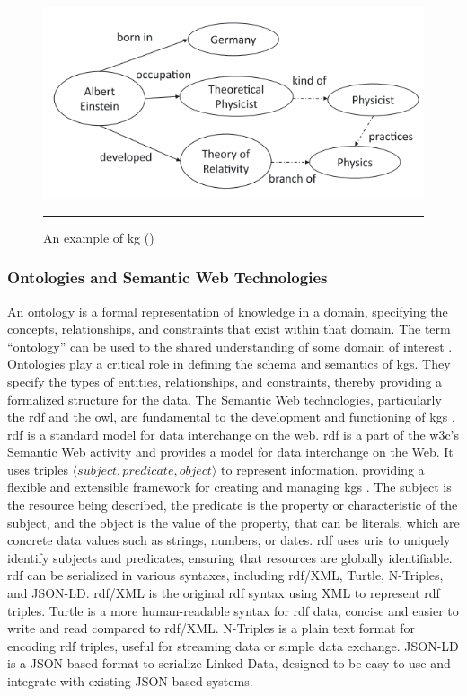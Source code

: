 \begin{figure}[htbp]
    \centering
 \includegraphics[width=.7\textwidth]{figures/literature-review/kg-example-albert-einstein.png}
     \rule{35em}{0.5pt}
    \caption{An example of \acrlong{kg} (\textcite{Chaudhri2022})} 
 \label{fig:kg-example-albert-einstein}
\end{figure}

\subsubsection*{Ontologies and Semantic Web Technologies}
An ontology is a formal representation of knowledge in a domain, specifying the concepts, relationships, and constraints that exist within that domain. The term ``ontology'' can be used to the shared understanding of some domain of interest \cite{Uschold1996}.
Ontologies play a critical role in defining the schema and semantics of \glspl{kg}. They specify the types of entities, relationships, and constraints, thereby providing a formalized structure for the data. The Semantic Web technologies, particularly the \gls{rdf} and the \gls{owl}, are fundamental to the development and functioning of \glspl{kg} \cite{Antoniou2008}.
\\\gls{rdf} is a standard model for data interchange on the web.
\gls{rdf} is a part of the \gls{w3c}'s Semantic Web activity and provides a model for data interchange on the Web.
It uses triples $\langle subject,predicate,object \rangle$ to represent information, providing a flexible and extensible framework for creating and managing \glspl{kg} \cite{Cyganiak14RCA}.
The subject is the resource being described, the predicate is the property or characteristic of the subject, and the object is the value of the property, that can be literals, which are concrete data values such as strings, numbers, or dates.
\gls{rdf} uses \glspl{uri} to uniquely identify subjects and predicates, ensuring that resources are globally identifiable.
\gls{rdf} can be serialized in various syntaxes, including \gls{rdf}/XML, Turtle, N-Triples, and JSON-LD. \gls{rdf}/XML is the original \gls{rdf} syntax using XML to represent \gls{rdf} triples. Turtle is a more human-readable syntax for \gls{rdf} data, concise and easier to write and read compared to \gls{rdf}/XML. N-Triples is a plain text format for encoding \gls{rdf} triples, useful for streaming data or simple data exchange. JSON-LD is a JSON-based format to serialize Linked Data, designed to be easy to use and integrate with existing JSON-based systems.

